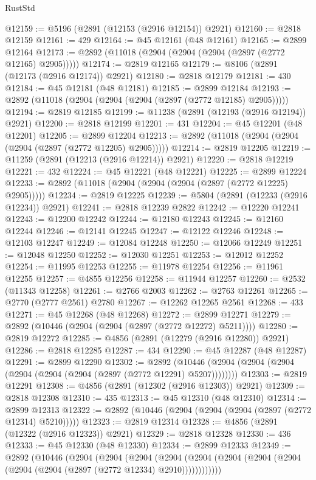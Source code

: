 \begin{lexlean}{RustStd}
\begin{coremodule}
@12159 := @5196 (@2891 (@12153 (@2916 @12154)) @2921)
@12160 := @2818 @12159
@12161 := 429
@12164 := @45 @12161 (@48 @12161)
@12165 := @2899 @12164
@12173 := @2892 (@11018 (@2904 (@2904 (@2904 (@2897 (@2772 @12165) @2905)))))
@12174 := @2819 @12165
@12179 := @8106 (@2891 (@12173 (@2916 @12174)) @2921)
@12180 := @2818 @12179
@12181 := 430
@12184 := @45 @12181 (@48 @12181)
@12185 := @2899 @12184
@12193 := @2892 (@11018 (@2904 (@2904 (@2904 (@2897 (@2772 @12185) @2905)))))
@12194 := @2819 @12185
@12199 := @11238 (@2891 (@12193 (@2916 @12194)) @2921)
@12200 := @2818 @12199
@12201 := 431
@12204 := @45 @12201 (@48 @12201)
@12205 := @2899 @12204
@12213 := @2892 (@11018 (@2904 (@2904 (@2904 (@2897 (@2772 @12205) @2905)))))
@12214 := @2819 @12205
@12219 := @11259 (@2891 (@12213 (@2916 @12214)) @2921)
@12220 := @2818 @12219
@12221 := 432
@12224 := @45 @12221 (@48 @12221)
@12225 := @2899 @12224
@12233 := @2892 (@11018 (@2904 (@2904 (@2904 (@2897 (@2772 @12225) @2905)))))
@12234 := @2819 @12225
@12239 := @5804 (@2891 (@12233 (@2916 @12234)) @2921)
@12241 := @2818 @12239 @2822
@12242 := @12220 @12241
@12243 := @12200 @12242
@12244 := @12180 @12243
@12245 := @12160 @12244
@12246 := @12141 @12245
@12247 := @12122 @12246
@12248 := @12103 @12247
@12249 := @12084 @12248
@12250 := @12066 @12249
@12251 := @12048 @12250
@12252 := @12030 @12251
@12253 := @12012 @12252
@12254 := @11995 @12253
@12255 := @11978 @12254
@12256 := @11961 @12255
@12257 := @4855 @12256
@12258 := @11944 @12257
@12260 := @2532 (@11343 @12258)
@12261 := @2766 @2003
@12262 := @2763 @12261
@12265 := @2770 (@2777 @2561) @2780
@12267 := @12262 @12265 @2561
@12268 := 433
@12271 := @45 @12268 (@48 @12268)
@12272 := @2899 @12271
@12279 := @2892 (@10446 (@2904 (@2904 (@2897 (@2772 @12272) @5211))))
@12280 := @2819 @12272
@12285 := @4856 (@2891 (@12279 (@2916 @12280)) @2921)
@12286 := @2818 @12285
@12287 := 434
@12290 := @45 @12287 (@48 @12287)
@12291 := @2899 @12290
@12302 := @2892
    (@10446 (@2904 (@2904 (@2904 (@2904 (@2904 (@2904 (@2897 (@2772 @12291) @5207))))))))
@12303 := @2819 @12291
@12308 := @4856 (@2891 (@12302 (@2916 @12303)) @2921)
@12309 := @2818 @12308
@12310 := 435
@12313 := @45 @12310 (@48 @12310)
@12314 := @2899 @12313
@12322 := @2892 (@10446 (@2904 (@2904 (@2904 (@2897 (@2772 @12314) @5210)))))
@12323 := @2819 @12314
@12328 := @4856 (@2891 (@12322 (@2916 @12323)) @2921)
@12329 := @2818 @12328
@12330 := 436
@12333 := @45 @12330 (@48 @12330)
@12334 := @2899 @12333
@12349 := @2892
    (@10446
      (@2904
        (@2904
          (@2904
            (@2904 (@2904 (@2904 (@2904 (@2904 (@2904 (@2904 (@2897 (@2772 @12334) @2910))))))))))))

\end{coremodule}
\end{lexlean}
